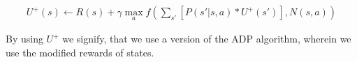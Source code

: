 \documentclass{llncs}
\begin{document}
\begin{align*}
U^{+}(s) \leftarrow R(s)+\gamma\max_{a}f(\sum_{s'}[P(s'|s,a)*U^{+}(s')], N(s,a))
\end{align*}

By using $U^{+}$ we signify, that we use a version of the ADP algorithm, wherein we use the modified rewards of states.

\end{document}

